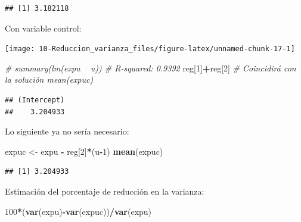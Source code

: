 \documentclass[]{book}
\newenvironment{Shaded}{\begin{snugshade}}{\end{snugshade}}
\newcommand{\KeywordTok}[1]{\textcolor[rgb]{0.13,0.29,0.53}{\textbf{#1}}}
\newcommand{\DataTypeTok}[1]{\textcolor[rgb]{0.13,0.29,0.53}{#1}}
\newcommand{\DecValTok}[1]{\textcolor[rgb]{0.00,0.00,0.81}{#1}}
\newcommand{\StringTok}[1]{\textcolor[rgb]{0.31,0.60,0.02}{#1}}
\newcommand{\CommentTok}[1]{\textcolor[rgb]{0.56,0.35,0.01}{\textit{#1}}}
\newcommand{\OperatorTok}[1]{\textcolor[rgb]{0.81,0.36,0.00}{\textbf{#1}}}
\newcommand{\NormalTok}[1]{#1}
\theoremstyle{definition}
\theoremstyle{definition}
\theoremstyle{definition}
\theoremstyle{remark}
\begin{document}
\begin{verbatim}
## [1] 3.182118
\end{verbatim}

Con variable control:

\begin{Shaded}
\end{Shaded}

\begin{center}\texttt{[image: 10-Reduccion\_varianza\_files/figure-latex/unnamed-chunk-17-1]} \end{center}

\begin{Shaded}
\begin{Highlighting}[]
\CommentTok{# summary(lm(expu ~ u)) # R-squared: 0.9392}
\NormalTok{reg[}\DecValTok{1}\NormalTok{]}\OperatorTok{+}\NormalTok{reg[}\DecValTok{2}\NormalTok{] }\CommentTok{# Coincidirá con la solución mean(expuc)}
\end{Highlighting}
\end{Shaded}

\begin{verbatim}
## (Intercept) 
##    3.204933
\end{verbatim}

Lo siguiente ya no sería necesario:

\begin{Shaded}
\begin{Highlighting}[]
\NormalTok{expuc <-}\StringTok{ }\NormalTok{expu }\OperatorTok{-}\StringTok{ }\NormalTok{reg[}\DecValTok{2}\NormalTok{]}\OperatorTok{*}\NormalTok{(u}\OperatorTok{-}\DecValTok{1}\NormalTok{)}
\KeywordTok{mean}\NormalTok{(expuc)  }
\end{Highlighting}
\end{Shaded}

\begin{verbatim}
## [1] 3.204933
\end{verbatim}

Estimación del porcentaje de reducción en la varianza:

\begin{Shaded}
\begin{Highlighting}[]
\DecValTok{100}\OperatorTok{*}\NormalTok{(}\KeywordTok{var}\NormalTok{(expu)}\OperatorTok{-}\KeywordTok{var}\NormalTok{(expuc))}\OperatorTok{/}\KeywordTok{var}\NormalTok{(expu)}
\end{Highlighting}
\end{Shaded}
\end{document}
